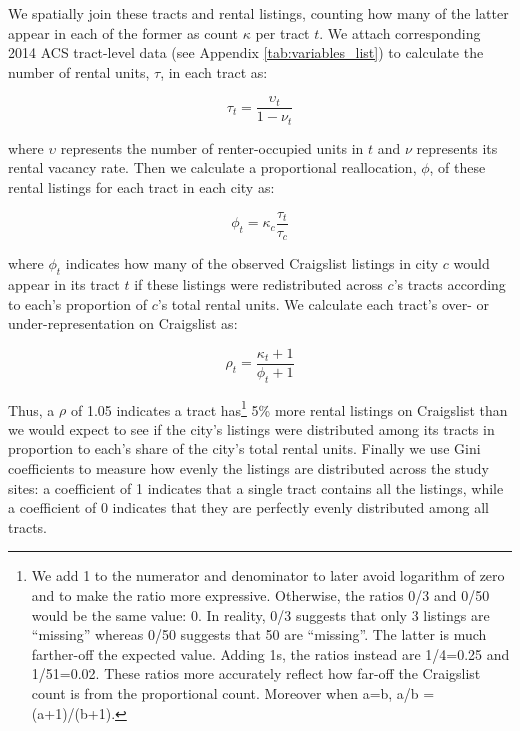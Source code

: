 \documentclass[12pt,onecolumn]{article} %
\begin{document}
We spatially join these tracts and rental listings, counting how many of the latter appear in each of the former as count $\kappa$ per tract $t$. We attach corresponding 2014 ACS tract-level data (see Appendix \ref{tab:variables_list}) to calculate the number of rental units, $\tau$, in each tract as:

\begin{equation}
	\label{eq:count_units}
	\tau_t = \frac{\upsilon_t}{1 - \nu_t}
\end{equation}

where $\upsilon$ represents the number of renter-occupied units in $t$ and $\nu$ represents its rental vacancy rate. Then we calculate a proportional reallocation, $\phi$, of these rental listings for each tract in each city as:

\begin{equation}
	\label{eq:allocation}
	\phi_t = \kappa_c \frac{\tau_t}{\tau_c}
\end{equation}

where $\phi_t$ indicates how many of the observed Craigslist listings in city $c$ would appear in its tract $t$ if these listings were redistributed across $c$'s tracts according to each's proportion of $c$'s total rental units. We calculate each tract's over- or under-representation on Craigslist as:

\begin{equation}
	\label{eq:overrepresentation}
	\rho_t = \frac{\kappa_t + 1}{\phi_t + 1}
\end{equation}

Thus, a $\rho$ of 1.05 indicates a tract has\footnote{We add 1 to the numerator and denominator to later avoid logarithm of zero and to make the ratio more expressive. Otherwise, the ratios 0/3 and 0/50 would be the same value: 0. In reality, 0/3 suggests that only 3 listings are \enquote{missing} whereas 0/50 suggests that 50 are \enquote{missing}. The latter is much farther-off the expected value. Adding 1s, the ratios instead are 1/4=0.25 and 1/51=0.02. These ratios more accurately reflect how far-off the Craigslist count is from the proportional count. Moreover when a=b, a/b = (a+1)/(b+1).} 5\% more rental listings on Craigslist than we would expect to see if the city's listings were distributed among its tracts in proportion to each's share of the city's total rental units. Finally we use Gini coefficients to measure how evenly the listings are distributed across the study sites: a coefficient of 1 indicates that a single tract contains all the listings, while a coefficient of 0 indicates that they are perfectly evenly distributed among all tracts.
\end{document}
